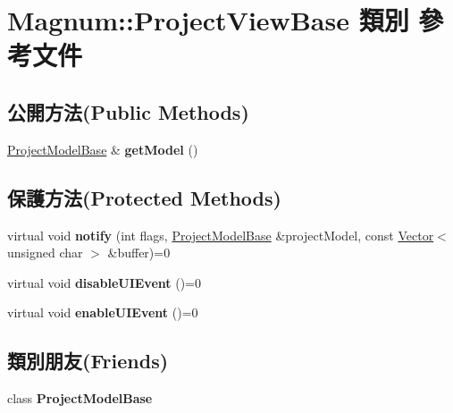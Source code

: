 \hypertarget{class_magnum_1_1_project_view_base}{}\section{Magnum\+:\+:Project\+View\+Base 類別 參考文件}
\label{class_magnum_1_1_project_view_base}
\subsection*{公開方法(Public Methods)}
\begin{DoxyCompactItemize}
\item 
\hyperlink{class_magnum_1_1_project_model_base}{Project\+Model\+Base} \& {\bfseries get\+Model} ()\hypertarget{class_magnum_1_1_project_view_base_ac78f072148f802b0b7523e98d468f296}{}\label{class_magnum_1_1_project_view_base_ac78f072148f802b0b7523e98d468f296}

\end{DoxyCompactItemize}
\subsection*{保護方法(Protected Methods)}
\begin{DoxyCompactItemize}
\item 
virtual void {\bfseries notify} (int flags, \hyperlink{class_magnum_1_1_project_model_base}{Project\+Model\+Base} \&project\+Model, const \hyperlink{class_magnum_1_1_vector}{Vector}$<$ unsigned char $>$ \&buffer)=0\hypertarget{class_magnum_1_1_project_view_base_ad933703a1354b6b78788c4908de56eb5}{}\label{class_magnum_1_1_project_view_base_ad933703a1354b6b78788c4908de56eb5}

\item 
virtual void {\bfseries disable\+U\+I\+Event} ()=0\hypertarget{class_magnum_1_1_project_view_base_aacb67065bb48c8ebeae90a8abfae9115}{}\label{class_magnum_1_1_project_view_base_aacb67065bb48c8ebeae90a8abfae9115}

\item 
virtual void {\bfseries enable\+U\+I\+Event} ()=0\hypertarget{class_magnum_1_1_project_view_base_abe97a9417c6615dc4d9af32901aafedf}{}\label{class_magnum_1_1_project_view_base_abe97a9417c6615dc4d9af32901aafedf}

\end{DoxyCompactItemize}
\subsection*{類別朋友(Friends)}
\begin{DoxyCompactItemize}
\item 
class {\bfseries Project\+Model\+Base}\hypertarget{class_magnum_1_1_project_view_base_a4adee89a75f9facb060d3c44ba6db2ed}{}\label{class_magnum_1_1_project_view_base_a4adee89a75f9facb060d3c44ba6db2ed}

\end{DoxyCompactItemize}


